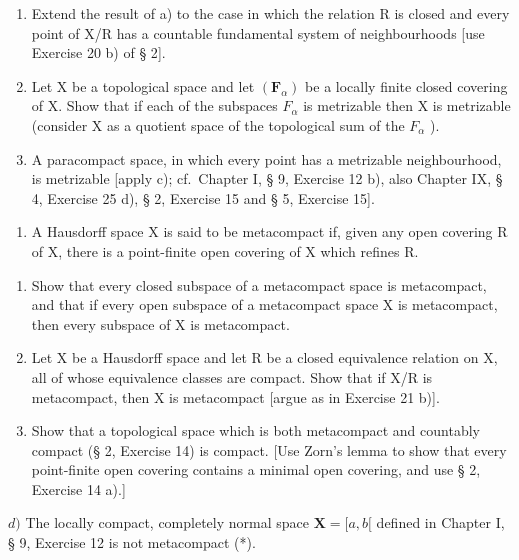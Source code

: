 \begin{enumerate}
\def\labelenumi{\alph{enumi})}
\setcounter{enumi}{1}
\item
  Extend the result of a) to the case in which the relation R is closed and every point of X/R has a countable fundamental system of neighbourhoods {[}use Exercise 20 b) of § 2{]}.
\item
  Let X be a topological space and let \((\mathbf{F}_{\alpha})\) be a locally finite closed covering of X. Show that if each of the subspaces \(F_{\alpha}\) is metrizable then X is metrizable (consider X as a quotient space of the topological sum of the \(F_{\alpha}\) ).
\item
  A paracompact space, in which every point has a metrizable neighbourhood, is metrizable {[}apply c); cf.~Chapter I, § 9, Exercise 12 b), also Chapter IX, § 4, Exercise 25 d), § 2, Exercise 15 and § 5, Exercise 15{]}.
\end{enumerate}

\begin{enumerate}
\def\labelenumi{\arabic{enumi})}
\setcounter{enumi}{24}
\tightlist
\item
  A Hausdorff space X is said to be metacompact if, given any open covering R of X, there is a point-finite open covering of X which refines R.
\end{enumerate}

\begin{enumerate}
\def\labelenumi{\alph{enumi})}
\item
  Show that every closed subspace of a metacompact space is metacompact, and that if every open subspace of a metacompact space X is metacompact, then every subspace of X is metacompact.
\item
  Let X be a Hausdorff space and let R be a closed equivalence relation on X, all of whose equivalence classes are compact. Show that if X/R is metacompact, then X is metacompact {[}argue as in Exercise 21 b){]}.
\item
  Show that a topological space which is both metacompact and countably compact (§ 2, Exercise 14) is compact. {[}Use Zorn's lemma to show that every point-finite open covering contains a minimal open covering, and use § 2, Exercise 14 a).{]}
\end{enumerate}

\(d)\) The locally compact, completely normal space \(\mathbf{X} = [a, b[\) defined in Chapter I, § 9, Exercise 12 is not metacompact (*).


